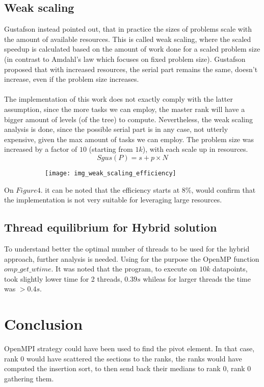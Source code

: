 \documentclass[11pt]{article}
\newcommand{\plotheight}{0.425}
\newcommand{\plotwidth}{0.7}
\begin{document}
\subsection{Weak scaling}
Gustafson instead pointed out, that in practice the sizes of problems scale with the amount of available resources.
This is called weak scaling, where the scaled speedup is calculated based on the amount of work done for a scaled problem size (in contrast to Amdahl’s law which focuses on fixed problem size). Gustafson proposed that with increased resources, the serial part remains the same, doesn't increase, even if the problem size increases.\\\\The implementation of this work does not exactly comply with the latter assumption, since the more tasks we can employ, the master rank will have a bigger amount of levels (of the tree) to compute. Nevertheless, the weak scaling analysis is done, since the possible serial part is in any case, not utterly expensive, given the max amount of tasks we can employ. The problem size was increased by a factor of $10$ (starting from $1k$), with each scale up in resources.
\begin{equation} \label{eqn}
	Sgus(P) = {s + p × N} 
\end{equation}
\begin{figure}[H]
\centering
\begin{subfigure}{\plotwidth\textwidth}
\centering
\texttt{[image: img\_weak\_scaling\_efficiency]}
\end{subfigure}
\end{figure}
On $Figure 4.$ it can be noted that the efficiency starts at $8\%$, would confirm that the implementation is not very suitable for leveraging large resources.
\subsection{Thread equilibrium for Hybrid solution}
To understand better the optimal number of threads to be used for the hybrid approach, further analysis is needed.
Using for the purpose the OpenMP function $omp\_get\_wtime$.
It was noted that the program, to execute on $10k$ datapoints, took slightly lower time for 2 threads, $0.39s$ whileas for larger threads the time was $>0.4s$.
\section{Conclusion}
OpenMPI strategy could have been used to find the pivot element. In that case, rank 0 would have scattered the sections to the ranks, the ranks would have computed the insertion sort, to then send back their medians to rank 0, rank 0 gathering them.
\end{document}
